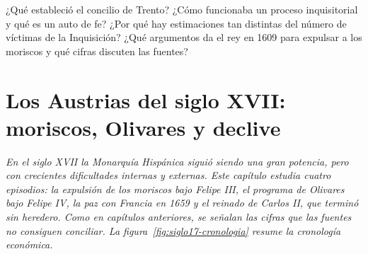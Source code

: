 \documentclass{book}
\begin{document}
\begin{tcolorbox}[title={Autoficha}, studiumcheck, breakable]

¿Qué estableció el concilio de Trento? ¿Cómo funcionaba un proceso inquisitorial y qué es un auto de fe? ¿Por qué hay estimaciones tan distintas del número de víctimas de la Inquisición? ¿Qué argumentos da el rey en 1609 para expulsar a los moriscos y qué cifras discuten las fuentes?

\end{tcolorbox}

\chapter{Los Austrias del siglo XVII: moriscos, Olivares y declive}
\label{chap:hist-05}

\noindent\textit{En el siglo XVII la Monarquía Hispánica siguió siendo una gran potencia, pero con crecientes dificultades internas y externas. Este capítulo estudia cuatro episodios: la expulsión de los moriscos bajo Felipe III, el programa de Olivares bajo Felipe IV, la paz con Francia en 1659 y el reinado de Carlos II, que terminó sin heredero. Como en capítulos anteriores, se señalan las cifras que las fuentes no consiguen conciliar. La figura~\ref{fig:siglo17-cronologia} resume la cronología económica.}

\end{document}
